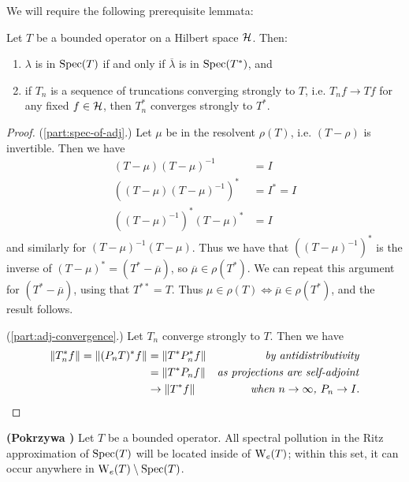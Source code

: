 \documentclass[../main.tex]{subfiles}
\begin{document}
We will require the following prerequisite lemmata:
\begin{lemma}\label{thm:adjoint-spec-props}
  Let $T$ be a bounded operator on a Hilbert space $\mathcal{H}$. Then:
  \begin{enumerate}
  \item
  \label{part:spec-of-adj}
    $\lambda$ is in $\mathrm{Spec}(T)$ if and only if $\overline{\lambda}$ is in $\mathrm{Spec}(T^*)$, and
  \item
  \label{part:adj-convergence}
    if $T_n$ is a sequence of truncations converging strongly to $T$, i.e. $T_n f
    \rightarrow Tf$ for any fixed $f \in \mathcal{H}$, then $T_n^*$ converges
    strongly to $T^*$.
  \end{enumerate}
\end{lemma}
\begin{proof}
(\ref{part:spec-of-adj}.) Let $\mu$ be in the resolvent $\rho(T)$,
i.e. $(T - \rho)$ is invertible. Then we have
\begin{align*}
(T - \mu)(T - \mu)^{-1} & = I \\
((T - \mu)(T - \mu)^{-1})^* & = I^* = I \\
((T - \mu)^{-1})^*(T - \mu)^* & = I
\end{align*}
and similarly for $(T - \mu)^{-1}(T - \mu)$. Thus we have that 
$((T - \mu)^{-1})^*$ is the inverse of $(T - \mu)^* = (T^* - \overline{\mu})$,
so $\overline{\mu} \in \rho(T^*)$. We can repeat this argument for 
$(T^* - \overline{\mu})$, using that $T^{**} = T$. Thus $\mu \in \rho(T)
\Leftrightarrow \overline{\mu} \in \rho(T^*)$, and the result follows.

(\ref{part:adj-convergence}.) Let $T_n$ converge strongly to $T$. Then we have
  \begin{align*}
    \|T_n^*f\| = \|(P_n T)^* f\| & = \|T^* P_n^* f\| & \text{\emph{by antidistributivity}} \\
    & = \|T^* P_n f\| & \text{\emph{as projections are self-adjoint}} \\
    & \rightarrow \|T^* f\| & \text{\emph{when $n \rightarrow \infty$, $P_n \rightarrow I$}}.
  \end{align*}
\end{proof}

\begin{theorem}{\textbf{(Pokrzywa \cite{pokrzywa1979method})}}
\label{thm:pokrzywa}
  Let $T$ be a bounded operator. All spectral pollution in the Ritz approximation
  of $\mathrm{Spec}(T)$ will be located inside of $\mathrm{W}_e(T)$; within this set, it can
  occur anywhere in $\mathrm{W}_e(T) \setminus \mathrm{Spec}(T)$.
\end{theorem}
\end{document}
